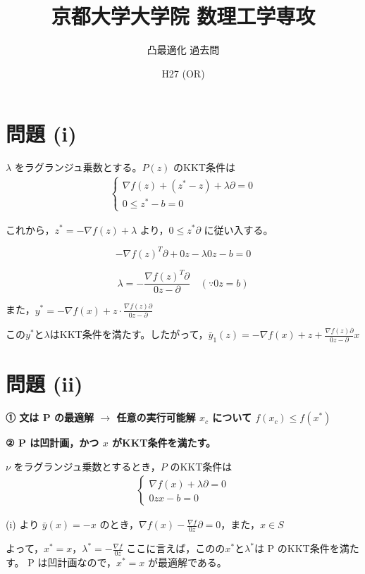 \documentclass[12pt,a4paper]{article}
\title{京都大学大学院 数理工学専攻}
\author{凸最適化 過去問}
\date{H27 (OR)}
\begin{document}
\maketitle

\section*{問題 (i)}

$\lambda$ をラグランジュ乗数とする。$P(z)$ のKKT条件は
\begin{align}
\begin{cases}
\nabla f(z) + (z^* - z) + \lambda \partial = 0 \\
0 \leq z^* - b = 0
\end{cases}
\end{align}

これから，$z^* = - \nabla f(z) + \lambda$ より，$0 \leq z^* \partial$ に従い入する。

\[-\nabla f(z)^T \partial + 0z - \lambda 0z - b = 0\]

\[\lambda = - \frac{\nabla f(z)^T \partial}{0z - \partial} \quad (\because 0z = b)\]

また，$y^* = -\nabla f(x) + z \cdot \frac{\nabla f(z) \partial}{0z - \partial}$

この$y^*$と$\lambda$はKKT条件を満たす。したがって，$\bar{y}_1(z) = -\nabla f(x) + z + \frac{\nabla f(z)\partial}{0z - \partial} x$

\section*{問題 (ii)}

\textbf{① 文は P の最適解 $\rightarrow$ 任意の実行可能解 $x_c$ について $f(x_c) \leq f(x^*)$}

\textbf{② P は凹計画，かつ $x$ がKKT条件を満たす。}

$\nu$ をラグランジュ乗数とするとき，$P$ のKKT条件は
\begin{align}
\begin{cases}
\nabla f(x) + \lambda \partial = 0 \\
0z x - b = 0
\end{cases}
\end{align}

(i) より $\bar{y}(x) = -x$ のとき，$\nabla f(x) - \frac{\nabla f}{0z} \partial = 0$，また，$x \in S$

よって，$x^* = x$，$\lambda^* = -\frac{\nabla f}{0z}$ ここに言えば，このの$x^*$と$\lambda^*$は P のKKT条件を満たす。
P は凹計画なので，$x^* = x$ が最適解である。
\end{document}

